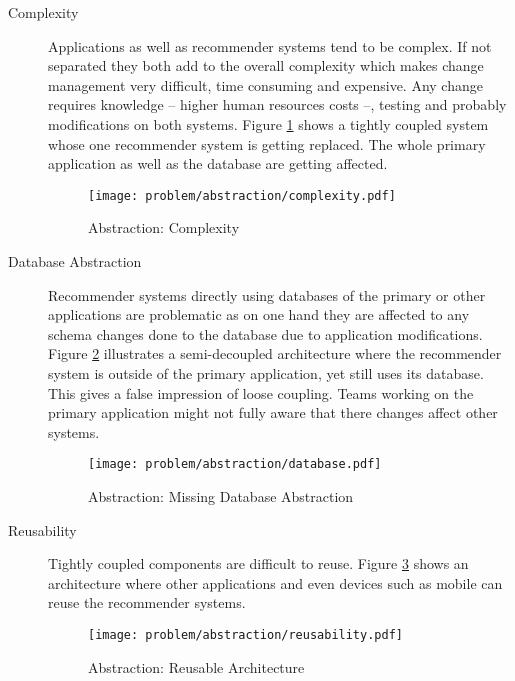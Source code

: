 \begin{description}

    \item[Complexity] Applications as well as recommender systems tend to be complex. If not separated they both add to the overall complexity which makes change management very difficult, time consuming and expensive. Any change requires knowledge -- higher human resources costs --, testing and probably modifications on both systems. Figure \ref{fig:abstraction-complexity} shows a tightly coupled system whose one recommender system is getting replaced. The whole primary application as well as the database are getting affected.

    \begin{figure}[H]
        \texttt{[image: problem/abstraction/complexity.pdf]}
        \caption{Abstraction: Complexity}
        \label{fig:abstraction-complexity}
    \end{figure}

    \item[Database Abstraction] Recommender systems directly using databases of the primary or other applications are problematic as on one hand they are affected to any schema changes done to the database due to application modifications. Figure \ref{fig:abstraction-database} illustrates a semi-decoupled architecture where the recommender system is outside of the primary application, yet still uses its database. This gives a false impression of loose coupling. Teams working on the primary application might not fully aware that there changes affect other systems.

    \begin{figure}[H]
        \texttt{[image: problem/abstraction/database.pdf]}
        \caption{Abstraction: Missing Database Abstraction}
        \label{fig:abstraction-database}
    \end{figure}

    \item[Reusability] Tightly coupled components are difficult to reuse. Figure \ref{fig:abstraction-resuability} shows an architecture where other applications and even devices such as mobile can reuse the recommender systems.

    \begin{figure}[H]
        \texttt{[image: problem/abstraction/reusability.pdf]}
        \caption{Abstraction: Reusable Architecture}
        \label{fig:abstraction-resuability}
    \end{figure}


\end{description}
